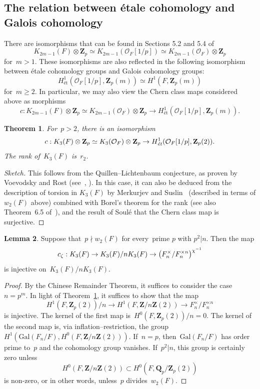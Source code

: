 \documentclass[12pt,reqno]{amsart}
\newtheorem{theorem}{Theorem}[section]
\theoremstyle{definition}
\newtheorem{lemma}[theorem]{Lemma}
\newcommand{\changed}[1]{{#1}}
\def\be{\begin{equation}}
\def\ee{\end{equation}}
\def\Q{\mathbf Q}   %
\def\Z{\mathbf Z}   %
\def\nn{n}
\def\ll{m}
\def\et{\text{\'{e}t}}
\def\fet{\text{\emph{\'{e}t}}}
\def\Gal{\mathrm{Gal}}
\def\OL{\mathcal{O}}
\begin{document}
\subsection{The relation between \'etale cohomology and
Galois cohomology}
\label{section:relations}

There are isomorphisms that can be found in Sections 5.2 and 5.4
of~\cite{Weibel}
\be
\label{useful}
K_{2m-1}(F) \otimes \Z_p \simeq K_{2m-1}(\OL_F[1/p]) \simeq 
K_{2m-1}(\OL_F) \otimes \Z_p
\ee
for~$m > 1$. These isomorphisms are also reflected in the following 
isomorphism between \'etale cohomology groups and Galois cohomology groups:
$$
H^1_{\et}(\OL_F[1/p],\Z_p(m) ) \simeq H^1(F,\Z_p(m) )
$$
for~$m \ge 2$.  In particular, we may also view the Chern class maps
considered above as morphisms
$$c: K_{2m-1}(F) \otimes \Z_p \simeq
K_{2m-1}(\OL_F) \otimes \Z_p \rightarrow H^1_{\et}(\OL_F[1/p],\Z_p(m) ).$$

\begin{theorem}
\label{theorem:surjective2} 
For~$p > 2$, there is an isomorphism
$$
c: K_3(F)  \otimes \Z_p  \simeq K_3(\OL_F) \otimes \Z_p
\rightarrow H^1_{\fet}(\OL_F[1/p],\Z_p(2)).
$$
The rank of~$K_3(F)$ is~$r_2$. 
\end{theorem}

\begin{proof}[Sketch] 
This follows from the Quillen--Lichtenbaum conjecture,
as proven by Voevodsky and Rost (see~\cite{Weibel}, \cite{Voe}).
In this case, it can also be deduced  from the description of torsion
in $K_3(F)$ by Merkurjev and Suslin~\cite{Suslin} (described in 
terms of $w_2(F)$ above) combined with Borel's theorem for the rank 
(see also Theorem~6.5 of~\cite{TateK}), and the result
of Soul\'e  that the Chern class map is surjective.  
\end{proof}

\begin{lemma}
\label{lemma:sahinj2}
Suppose that~$p \nmid w_2(F)$ for every~\changed{prime $p$ with
  $p^2|n$}. Then the map
\begin{equation}
\label{eq.cnv1}
c_\z: K_3(F) \rightarrow K_3(F)/\nn K_3(F) \rightarrow
\left(F_\nn^{\times}/F_\nn^{\times \nn}\right)^{\chi^{-1}}
\end{equation}
is injective on~$K_3(F)/\nn K_3(F)$.
\end{lemma}

\begin{proof}
By the Chinese Remainder Theorem,  it suffices to consider the
case~$\nn = p^{\ll}$.
In light of Theorem~\ref{theorem:surjective2}, it suffices to show that
the map
$$
H^1(F,\Z_p(2))/{\nn} \rightarrow H^1(F,\Z/{\nn}\Z(2)) 
\rightarrow F_{{\nn}}^{\times}/F_{{\nn}}^{\times {{\nn}}}
$$
is injective. The kernel of the first map is~$H^0(F,\Z_p(2))/{{\nn}} = 0$.
The kernel of the second map is, via inflation--restriction, the group
$H^1(\Gal(F_n/F),H^0(F,\Z/{\nn}\Z(2)))$. \changed{If~$\nn = p$,
  then~$\Gal(F_n/F)$ has order prime to~$p$ and the
  cohomology group vanishes. If~$p^2 | n$,} this group is certainly zero 
unless
$$
H^0(F,\Z/{\nn}\Z(2)) \subset H^0(F,\Q_p/\Z_p(2))
$$
is non-zero, or in other words, unless~$p$ divides~$w_2(F)$.
\end{proof}
\end{document}
